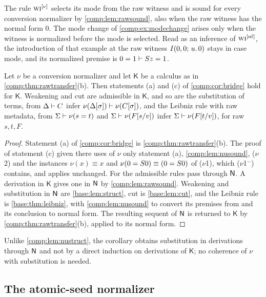 \begin{remark}
\label{comp:rem:rawwi}
The rule $\rulename{WI}^{[\nu]}$ selects its mode from the raw witness and
is sound for every conversion normalizer by \cref{comp:lem:rawsound}, also
when the raw witness has the normal form $0$. The mode change of
\cref{comp:ex:modechange} arises only when the witness is normalized before
the mode is selected. Read as an inference of $\rulename{WI}^{[\nf]}$, the
introduction of that example at the raw witness $I(0,0;\,u.\,0)$ stays in
case mode, and its normalized premise is $0=1\vdash S z=1$.
\end{remark}

\begin{corollary}
\label{comp:cor:rawbridge}
Let $\nu$ be a conversion normalizer and let $\mathsf K$ be a calculus as in
\cref{comp:thm:rawtransfer}(b). Then statements (a) and (c) of
\cref{comp:cor:bridge} hold for $\mathsf K$. Weakening and cut are admissible
in $\mathsf K$, and so are the substitution of terms, from
$\Delta\vdash C$ infer $\nu(\Delta[\sigma])\vdash\nu(C[\sigma])$, and the
Leibniz rule with raw metadata, from $\Sigma\vdash\nu(s=t)$ and
$\Sigma\vdash\nu(F[s/v])$ infer $\Sigma\vdash\nu(F[t/v])$, for raw
$s,t,F$.
\end{corollary}

\begin{proof}
Statement (a) of \cref{comp:cor:bridge} is \cref{comp:thm:rawtransfer}(b).
The proof of statement (c) given there uses of $\nu$ only statement (a),
\cref{comp:lem:nusound}, ($\nu$2) and the instances $\nu(x)\equiv x$ and
$\nu(0=S0)\equiv(0=S0)$ of ($\nu$1), which ($\nu$1$^{-}$) contains, and
applies unchanged. For
the admissible rules pass through $\mathsf{N}$. A derivation in $\mathsf K$ gives
one in $\mathsf{N}$ by \cref{comp:lem:rawsound}. Weakening and substitution in
$\mathsf{N}$ are \cref{base:lem:struct}, cut is \cref{base:lem:cut}, and the
Leibniz rule is \cref{base:thm:leibniz}, with \cref{comp:lem:nusound} to
convert its premises from and its conclusion to normal form. The resulting
sequent of $\mathsf{N}$ is returned to $\mathsf K$ by
\cref{comp:thm:rawtransfer}(b), applied to its normal form.
\end{proof}

Unlike \cref{comp:lem:nustruct}, the corollary obtains substitution in
derivations through $\mathsf{N}$ and not by a direct induction on derivations of
$\mathsf K$; no coherence of $\nu$ with substitution is needed.

\subsection{The atomic-seed normalizer}


